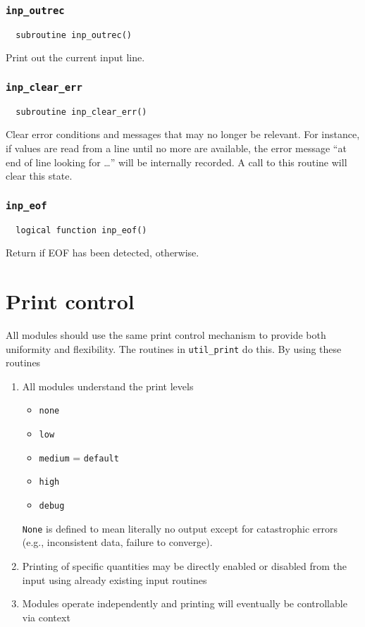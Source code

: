 \subsubsection{{\tt inp\_outrec}}
\begin{verbatim}
  subroutine inp_outrec()
\end{verbatim}
Print out the current input line.

\subsubsection{{\tt inp\_clear\_err}}
\begin{verbatim}
  subroutine inp_clear_err()
\end{verbatim}
Clear error conditions and messages that may no longer be relevant.
For instance, if values are read from a line until no more are
available, the error message ``at end of line looking for \ldots''
will be internally recorded.  A call to this routine will clear this state.

\subsubsection{{\tt inp\_eof}}
\begin{verbatim}
  logical function inp_eof()
\end{verbatim}
Return \TRUE if EOF has been detected, \FALSE otherwise.


\section{Print control}
\label{sec:print}

All modules should use the same print control mechanism to provide
both uniformity and flexibility.  The routines in \verb+util_print+ do
this.  By using these routines

\begin{enumerate}
\item All modules understand the print levels
\begin{itemize}
\item \verb+none+
\item \verb+low+
\item \verb+medium+ = \verb+default+
\item \verb+high+
\item \verb+debug+
\end{itemize}
\verb+None+ is defined to mean literally no output except for
catastrophic errors (e.g., inconsistent data, failure to converge).
\item Printing of specific quantities may be directly enabled or
  disabled from the input using already existing input routines
\item Modules operate independently and printing will eventually be
   controllable via context
\end{enumerate}

